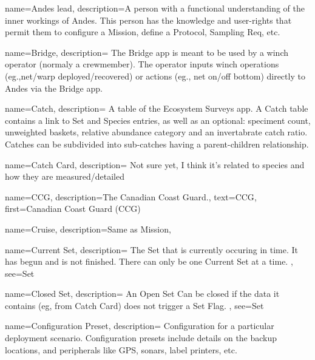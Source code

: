 \usepackage[nonumberlist,acronym,numberedsection]{glossaries}

\makenoidxglossaries

 {
  name=Andes lead,
  description={A person with a functional understanding of the inner workings of Andes.
   This person has the knowledge and user-rights that permit them to configure a \gls{Mission}, define a \gls{Protocol}, \gls{Sampling Req}, etc.}
}

 {
  name=Bridge,
  description={
    The Bridge app is meant to be used by a winch operator (normaly a crewmember).
    The operator inputs winch operations (eg.,net/warp deployed/recovered) or actions (eg., net on/off bottom) directly to Andes via the Bridge app. 
  }
}

 {
  name=Catch,
  description={
    A table of the Ecosystem Surveys app. A Catch table contains a link to \gls{Set} and \gls{Species} entries, as well as an optional: speciment count, unweighted baskets, relative abundance category and an invertabrate catch ratio. 
    Catches can be subdivided into sub-catches having a parent-children relationship.
  }
}
    
 {
  name=Catch Card,
  description={
    Not sure yet, I think it's related to species and how they are measured/detailed
  }
}

 {
  name=CCG,
  description={The Canadian Coast Guard.},
  text={CCG},
  first={Canadian Coast Guard (CCG)}
}

 {
  name=Cruise,
  description={Same as \gls{Mission}},
}

 {
  name=Current Set,
  description={
    The \gls{Set} that is currently occuring in time. 
    It has begun and is not finished. 
    There can only be one \gls{Current Set} at a time.
  },
  see={Set}
}

 {
  name=Closed Set,
  description={
    An \gls{Open Set} Can be closed if the data it contains (eg, from \gls{Catch Card}) does not trigger a \gls{Set Flag}.
  },
  see={Set}
}

  {
  name=Configuration Preset,
  description={
    Configuration for a particular deployment scenario. Configuration presets include details on the backup locations, and peripherals like GPS, sonars, label printers, etc.
  }
}

